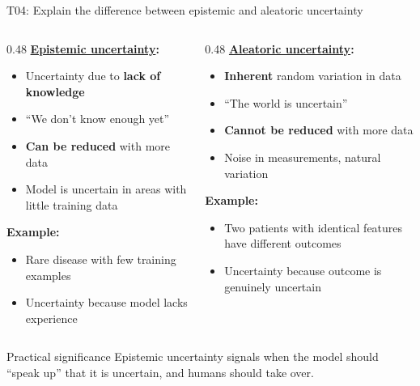 \documentclass[aspectratio=169, 10pt]{beamer}
\begin{document}
\begin{frame}{T04: Explain the difference between epistemic and aleatoric uncertainty}
    \begin{columns}[T]
        \begin{column}{0.48\textwidth}
            \textbf{\href{https://en.wikipedia.org/wiki/Uncertainty_quantification\#Epistemic_uncertainty}{Epistemic uncertainty}:}
            \begin{itemize}
                \item Uncertainty due to \textbf{lack of knowledge}
                \item ``We don't know enough yet''
                \item \textbf{Can be reduced} with more data
                \item Model is uncertain in areas with little training data
            \end{itemize}
            
            \vspace{0.3cm}
            \textbf{Example:}
            \begin{itemize}
                \item Rare disease with few training examples
                \item Uncertainty because model lacks experience
            \end{itemize}
        \end{column}
        \begin{column}{0.48\textwidth}
            \textbf{\href{https://en.wikipedia.org/wiki/Uncertainty_quantification\#Aleatoric_uncertainty}{Aleatoric uncertainty}:}
            \begin{itemize}
                \item \textbf{Inherent} random variation in data
                \item ``The world is uncertain''
                \item \textbf{Cannot be reduced} with more data
                \item Noise in measurements, natural variation
            \end{itemize}
            
            \vspace{0.3cm}
            \textbf{Example:}
            \begin{itemize}
                \item Two patients with identical features have different outcomes
                \item Uncertainty because outcome is genuinely uncertain
            \end{itemize}
        \end{column}
    \end{columns}
    
    \vspace{0.5cm}
    \begin{block}{Practical significance}
        Epistemic uncertainty signals when the model should ``speak up'' that it is uncertain, and humans should take over.
    \end{block}
\end{frame}
\end{document}

